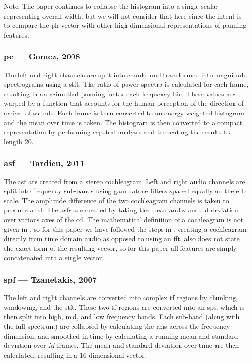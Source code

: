 \documentclass[twoside,a4paper]{article}
\begin{document}
Note: The paper continues to collapse the histogram into a single scalar representing overall width, but we will not consider that here since the intent is to compare the \gls{ph} vector with other high-dimensional representations of panning features.

\subsubsection{\acrfull{pc} --- Gomez, 2008 \cite{gomezMusicSimilaritySystems2008}}
The left and right channels are split into chunks and transformed into magnitude spectrograms using a \gls{stft}. The ratio of power spectra is calculated for each frame, resulting in an azimuthal panning factor each frequency bin. These values are warped by a function that accounts for the human perception of the direction of arrival of sounds. Each frame is then converted to an energy-weighted histogram and the mean over time is taken. The histogram is then converted to a compact representation by performing cepstral analysis and truncating the results to length 20.

\subsubsection{\acrfull{asf} --- Tardieu, 2011 \cite{tardieuProductionEffectAudio2011}}
The \gls{asf} are created from a stereo cochleagram. Left and right audio channels are split into frequency sub-bands using gammatone filters spaced equally on the \gls{erb} scale. The amplitude difference of the two cochleagram channels is taken to produce a \gls{cd}. The \glspl{asf} are created by taking the mean and standard deviation over various axes of the \gls{cd}. The mathematical definition of a cochleagram is not given in \cite{tardieuProductionEffectAudio2011}, so for this paper we have followed the steps in \cite{isobeRelationshipsInterauralCrosscorrelation2012}, creating a cochleagram directly from time domain audio as opposed to using an \gls{fft}. \cite{tardieuProductionEffectAudio2011} also does not state the exact form of the resulting vector, so for this paper all features are simply concatenated into a single vector.

\subsubsection{\acrfull{spf} --- Tzanetakis, 2007 \cite{tzanetakisStereoPanningFeatures2007}}
The left and right channels are converted into complex \gls{tf} regions by chunking, windowing, and the \gls{stft}. These two \gls{tf} regions are converted into an \gls{sps}, which is then split into high, mid, and low frequency bands. Each sub-band (along with the full spectrum) are collapsed by calculating the \gls{rms} across the frequency dimension, and smoothed in time by calculating a running mean and standard deviation over $M$ frames. The mean and standard deviation over time are then calculated, resulting in a 16-dimensional vector.
\end{document}
